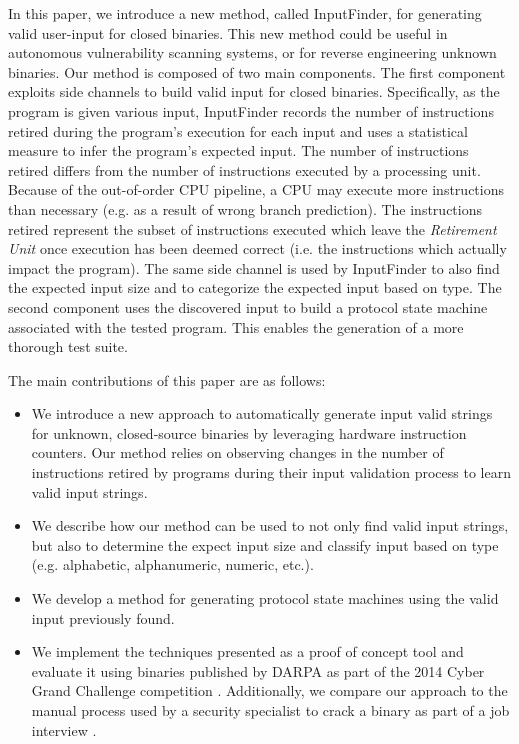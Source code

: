 \documentclass{acm_proc_article-sp}
\def \tool {InputFinder}
\begin{document}
In this paper, we introduce a new method, called InputFinder, for generating valid user-input for closed binaries. 
This new method could be useful in autonomous vulnerability scanning systems, or for reverse engineering unknown binaries.
Our method is composed of two main components.
The first component exploits side channels to build valid input for closed binaries.
Specifically, as the program is given various input, \tool{} records the number of instructions retired during the program's execution for each input and uses a statistical measure to infer the program's expected input.
The number of instructions retired differs from the number of instructions executed by a processing unit.
Because of the out-of-order CPU pipeline, a CPU may execute more instructions than necessary (e.g. as a result of wrong branch prediction).
The instructions retired represent the subset of instructions executed which leave the \textit{Retirement Unit} once execution has been deemed correct (i.e. the instructions which actually impact the program).
The same side channel is used by \tool{} to also find the expected input size and to categorize the expected input based on type.
The second component uses the discovered input to build a protocol state machine associated with the tested program.
This enables the generation of a more thorough test suite.

The main contributions of this paper are as follows:
\begin{itemize}
	\item We introduce a new approach to automatically generate input valid strings for unknown, closed-source binaries by leveraging hardware instruction counters. Our method relies on observing changes in the number of instructions retired by programs during their input validation process to learn valid input strings.
	\item We describe how our method can be used to not only find valid input strings, but also to determine the expect input size and classify input based on type (e.g. alphabetic, alphanumeric, numeric, etc.).
	\item We develop a method for generating protocol state machines using the valid input previously found.
	\item We implement the techniques presented as a proof of concept tool and evaluate it using binaries published by DARPA as part of the 2014 Cyber Grand Challenge competition \cite{darpacgc}. Additionally, we compare our approach to the manual process used by a security specialist to crack a binary as part of a job interview \cite{interviewbinary}.
\end{itemize}
\end{document}
